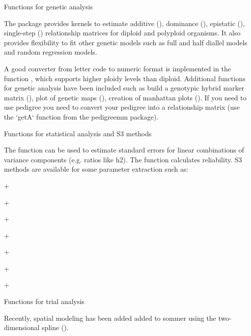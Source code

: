 \documentclass[a4paper]{book}
\begin{document}
\begin{Section}{Functions for genetic analysis}

The package provides kernels to estimate additive (), dominance
(), epistatic (), single-step () 
relationship matrices for diploid and polyploid organisms. It also provides flexibility 
to fit other genetic models such as full and half diallel models and random regression models.

A good converter from letter code to numeric format is implemented in the function 
, which supports higher ploidy levels than diploid. 
Additional functions for genetic analysis have been included such as build a 
genotypic hybrid marker matrix (), plot of genetic maps
(), creation of manhattan plots ().
If you need to use pedigree you need to convert your pedigree into a relationship 
matrix (use the `getA` function from the pedigreemm package).

\end{Section}
%
\begin{Section}{Functions for statistical analysis and S3 methods}

The  function can be used to estimate standard errors for linear combinations of variance components (e.g. ratios like h2). The  function calculates reliability. S3 methods are available for some parameter extraction such as:

+ 

+ 

+ 

+ 

+ 

+ 

+ 

\end{Section}
%
\begin{Section}{Functions for trial analysis}

Recently, spatial modeling has been added added to sommer using the two-dimensional 
spline ().

\end{Section}
\end{document}
